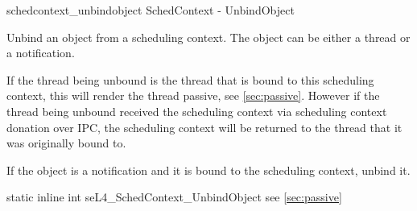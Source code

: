 %
%
%
%

\apidoc
{schedcontext_unbindobject}
{SchedContext - UnbindObject}
{Unbind an object from a scheduling context. The object can be either a thread or a notification.

If the thread being unbound is the thread that is bound to this scheduling context, this will render the thread passive, see \autoref{sec:passive}. However if the thread being unbound received the scheduling context via scheduling context donation over IPC, the scheduling context will be returned to the thread that it was originally bound to.

If the object is a notification and it is bound to the scheduling context, unbind it. 
}
{static inline int seL4\_SchedContext\_UnbindObject}
{
}
{\errorenumdesc}
{see \autoref{sec:passive}}
